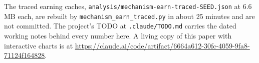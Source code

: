 \documentclass[11pt]{article}
\begin{document}
The traced earning caches, \texttt{analysis/mechanism-earn-traced-SEED.json} at 6.6 MB each, are rebuilt by \texttt{mechanism\_earn\_traced.py} in about 25 minutes and are not committed. The project's TODO at \texttt{.claude/TODO.md} carries the dated working notes behind every number here. A living copy of this paper with interactive charts is at \url{https://claude.ai/code/artifact/6664a612-30fc-4059-9fa8-71124f164828}.
\end{document}
